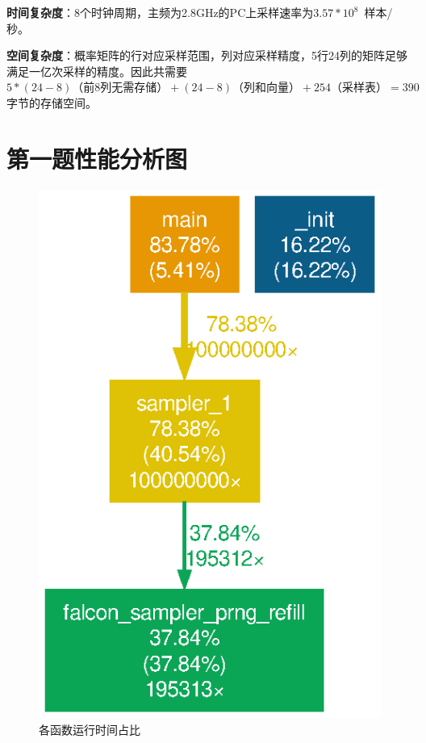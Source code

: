 \documentclass{article}
\begin{document}
    \textbf{时间复杂度}：8个时钟周期，主频为2.8GHz的PC上采样速率为$3.57*10^8$~样本/秒。
    
    \textbf{空间复杂度}：概率矩阵的行对应采样范围，列对应采样精度，5行24列的矩阵足够满足一亿次采样的精度。因此共需要$5 * (24-8)\mbox{（前8列无需存储）} + (24-8)\mbox{（列和向量）} + 254\mbox{（采样表）} = 390$字节的存储空间。
    
    
    \appendix
    \newpage
    \section{第一题性能分析图}
    \begin{figure}[htb]
        \centering
        \includegraphics[width=.6\textwidth]{../gprof_figs/sampler_1.eps}
        \caption{各函数运行时间占比}
    \end{figure}
\end{document}
